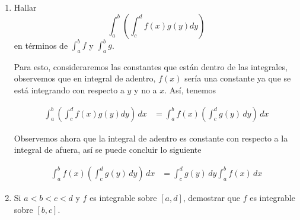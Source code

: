 \documentclass{report}
\begin{document}
\begin{enumerate}[label=\textcolor{NavyBlue}{\textbf{\arabic*.}}]
\begin{enumerate}[label=\textcolor{NavyBlue}{\textbf{\roman*.}}]
                \begin{center}
                \end{center}

            \end{enumerate}
            \item Hallar
            $$\int_{a}^{b}\left(\int_{c}^{d}f(x)g(y)dy\right)$$
            en términos de $\int_{a}^{b}f$ y $\int_{a}^{b}g$.

            Para esto, consideraremos las constantes que están dentro de las integrales, observemos que en integral de adentro, $f(x)$ sería una constante ya que se está integrando con respecto a $y$ y no a $x$. Así, tenemos

            \begin{align*}
                \int_{a}^{b}\left(\int_{c}^{d}f(x)g(y)dy\right)\, dx &= \int_{a}^{b}f(x)\left(\int_{c}^{d}g(y)\, dy\right)\, dx
            \end{align*}

            Observemos ahora que la integral de adentro es constante con respecto a la integral de afuera, así se puede concluir lo siguiente

            \begin{align*}
                \int_{a}^{b}f(x)\left(\int_{c}^{d}g(y)\, dy\right)\, dx &= \int_{c}^{d}g(y)\,dy \int_{a}^{b}f(x)\,dx
            \end{align*}

            \setcounter{enumi}{12}
            \item Si $a < b < c < d$ y $f$ es integrable sobre $[a, d]$, demostrar que $f$ es integrable sobre $[b,c]$.


\end{enumerate}
\end{document}
